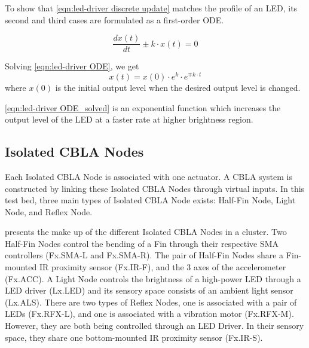 To show that \eqref{eqn:led-driver discrete update} matches the profile of an LED, its second and third cases are formulated as a first-order ODE. 

\begin{equation}\label{eqn:led-driver ODE}
	 \frac{dx(t)}{dt} \pm k \cdot x(t)  = 0
\end{equation}

Solving \eqref{eqn:led-driver ODE}, we get 
\begin{equation}\label{eqn:led-driver ODE_solved}
	x(t) = x(0) \cdot e^k \cdot e^{\mp k \cdot t}
\end{equation}
where $x(0)$ is the initial output level when the desired output level is changed.

\eqref{eqn:led-driver ODE_solved} is an exponential function which increases the output level of the LED at a faster rate at higher brightness region. 

\subsection{Isolated CBLA Nodes}\label{sec:isolated-cbla-node}

Each Isolated CBLA Node is associated with one actuator. A CBLA system is constructed by linking these Isolated CBLA Nodes through virtual inputs. In this test bed, three main types of Isolated CBLA Node exists: Half-Fin Node, Light Node, and Reflex Node.
 
 presents the make up of the different Isolated CBLA Nodes in a cluster. Two Half-Fin Nodes control the bending of a Fin through their respective SMA controllers (Fx.SMA-L and Fx.SMA-R). The pair of Half-Fin Nodes share a Fin-mounted IR proximity sensor (Fx.IR-F), and the 3 axes of the accelerometer (Fx.ACC). A Light Node controls the brightness of a high-power LED through a LED driver (Lx.LED) and its sensory space consists of an ambient light sensor (Lx.ALS). There are two types of Reflex Nodes, one is associated with a pair of LEDs (Fx.RFX-L), and one is associated with a vibration motor (Fx.RFX-M). However, they are both being controlled through an LED Driver. In their sensory space, they share one bottom-mounted IR proximity sensor (Fx.IR-S). 

